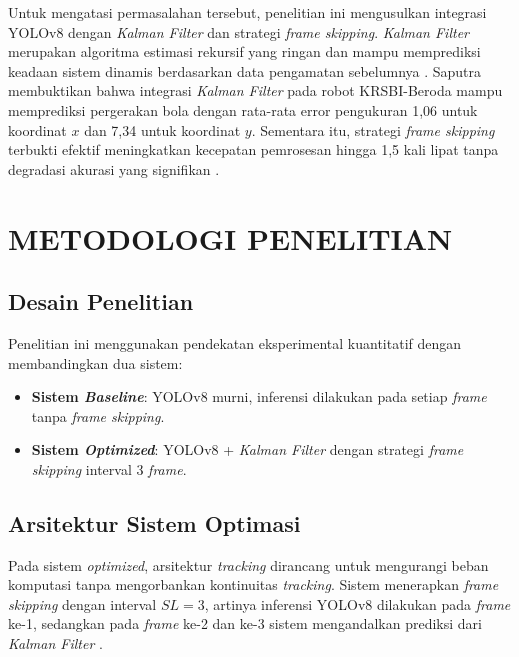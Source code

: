 \documentclass[12pt,a4paper]{article}
\begin{document}
Untuk mengatasi permasalahan tersebut, penelitian ini mengusulkan integrasi YOLOv8 dengan \textit{Kalman Filter} dan strategi \textit{frame skipping}. \textit{Kalman Filter} merupakan algoritma estimasi rekursif yang ringan dan mampu memprediksi keadaan sistem dinamis berdasarkan data pengamatan sebelumnya \cite{Sholehurrohman2023}. Saputra \cite{Saputra2023} membuktikan bahwa integrasi \textit{Kalman Filter} pada robot KRSBI-Beroda mampu memprediksi pergerakan bola dengan rata-rata error pengukuran 1,06 untuk koordinat $x$ dan 7,34 untuk koordinat $y$. Sementara itu, strategi \textit{frame skipping} terbukti efektif meningkatkan kecepatan pemrosesan hingga 1,5 kali lipat tanpa degradasi akurasi yang signifikan \cite{Lee2024}.

\section{METODOLOGI PENELITIAN}

\subsection{Desain Penelitian}
Penelitian ini menggunakan pendekatan eksperimental kuantitatif dengan membandingkan dua sistem:
\begin{itemize}
    \item \textbf{Sistem \textit{Baseline}}: YOLOv8 murni, inferensi dilakukan pada setiap \textit{frame} tanpa \textit{frame skipping}.
    \item \textbf{Sistem \textit{Optimized}}: YOLOv8 + \textit{Kalman Filter} dengan strategi \textit{frame skipping} interval 3 \textit{frame}.
\end{itemize}

\subsection{Arsitektur Sistem Optimasi}
Pada sistem \textit{optimized}, arsitektur \textit{tracking} dirancang untuk mengurangi beban komputasi tanpa mengorbankan kontinuitas \textit{tracking}. Sistem menerapkan \textit{frame skipping} dengan interval $SL = 3$, artinya inferensi YOLOv8 dilakukan pada \textit{frame} ke-1, sedangkan pada \textit{frame} ke-2 dan ke-3 sistem mengandalkan prediksi dari \textit{Kalman Filter} \cite{Taylor2016}.
\end{document}
